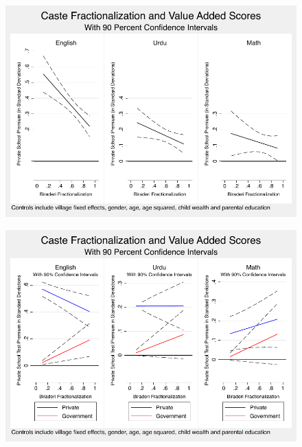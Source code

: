 \documentclass{beamer}
\begin{document}
\begin{frame}{}
	\begin{figure}[h]
		\centering	
		\includegraphics[scale=0.8]{graphs/kids_combined.pdf}
	\end{figure}
\end{frame}

\begin{frame}{}
	\begin{figure}[htb]
		\begin{center}
		\includegraphics[scale=0.8]{graphs/kids_combined_district.pdf}
		\end{center}
	\end{figure}
	
\end{frame}
\end{document}
